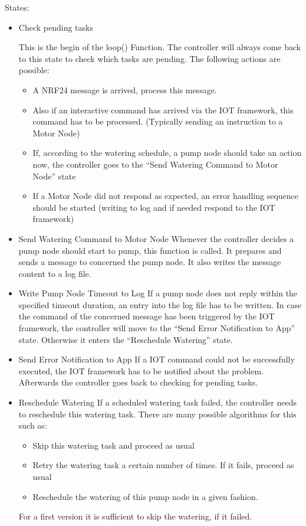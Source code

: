 \documentclass[12pt,a4paper,titlepage,oneside]{article}
\begin{document}
States:
\begin{itemize}
	\item Check pending tasks

		This is the begin of the loop() Function. The controller will always come back to this state to check which tasks are pending. The following actions are possible:

		\begin{itemize}
			\item A NRF24 message is arrived, process this message.
			\item Also if an interactive command has arrived via the IOT framework, this command has to be processed. (Typically sending an instruction to a Motor Node)
			\item If, according to the watering schedule, a pump node should take an action now, the controller goes to the ``Send Watering Command to Motor Node'' state
			\item If a Motor Node did not respond as expected, an error handling sequence should be started (writing to log and if needed respond to the IOT framework)
		\end{itemize}

	\item Send Watering Command to Motor Node
		Whenever the controller decides a pump node should start to pump, this function is called. 			It prepares and sends a message to concerned the pump node. It also writes the message content to a log file.
	\item Write Pump Node Timeout to Log
		If a pump node does not reply within the specified timeout duration, an entry into the log file has to be written. In case the command of the concerned message has been triggered by the IOT framework, the controller will move to the ``Send Error Notification to App'' state. Otherwise it enters the ``Reschedule Watering'' state.
	\item Send Error Notification to App
			If a IOT command could not be successfully executed, the IOT framework has to be notified about the problem. Afterwards the controller goes back to checking for pending tasks.
	\item Reschedule Watering
		If a scheduled watering task failed, the controller needs to reschedule this watering task.
		There are many possible algorithms for this such as:
		\begin{itemize}
			\item Skip this watering task and proceed as usual
			\item Retry the watering task a certain number of times. If it fails, proceed as usual
			\item Reschedule the watering of this pump node in a given fashion.
		\end{itemize}
		For a first version it is sufficient to skip the watering, if it failed.
		

\end{itemize}
\end{document}
